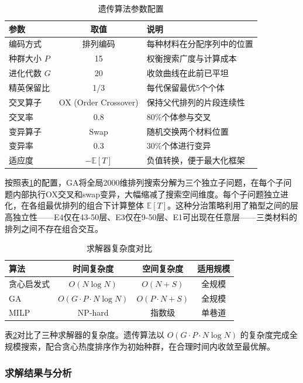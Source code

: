 \documentclass[a4paper]{cumcmthesis}
\newcommand{\headcol}{\rowcolor{tableheadcolor}}
\begin{document}
\begin{table}[htbp]
\centering\footnotesize
\caption{遗传算法参数配置}
\label{tab:ga_params}
\begin{tabular}{lcl}
\toprule
\headcol 参数 & 取值 & 说明 \\
\midrule
编码方式 & 排列编码 & 每种材料在分配序列中的位置 \\
种群大小 $P$ & 15 & 权衡搜索广度与计算成本 \\
进化代数 $G$ & 20 & 收敛曲线在此前已平坦 \\
精英保留比 & 1/3 & 每代保留最优5个个体 \\
交叉算子 & OX (Order Crossover) & 保持父代排列的片段连续性 \\
交叉率 & 0.8 & 80\%个体参与交叉 \\
变异算子 & Swap & 随机交换两个材料位置 \\
变异率 & 0.3 & 30\%个体进行变异 \\
适应度 & $-\mathbb{E}[T]$ & 负值转换，便于最大化框架 \\
\bottomrule
\end{tabular}
\end{table}

按照表\ref{tab:ga_params}的配置，GA将全局2000维排列搜索分解为三个独立子问题，在每个子问题内部执行OX交叉和swap变异，大幅缩减了搜索空间维度。每个子问题独立进化，在各组最优排列的组合下计算整体 $\mathbb{E}[T]$。这种分治策略利用了箱型之间的层高独立性——E4仅在43-50层、E3仅在9-50层、E1可出现在任意层——三类材料的排列之间不存在组合交互。

\begin{table}[htbp]
\centering\footnotesize
\caption{求解器复杂度对比}
\label{tab:complexity}
\begin{tabular}{lccc}
\toprule
\headcol 算法 & 时间复杂度 & 空间复杂度 & 适用规模 \\
\midrule
贪心启发式 & $O(N\log N)$ & $O(N+S)$ & 全规模\\
GA& $O(G\cdot P\cdot N\log N)$ & $O(P\cdot N + S)$ & 全规模\\
MILP& NP-hard & 指数级 & 单巷道\\
\bottomrule
\end{tabular}
\end{table}

表\ref{tab:complexity}对比了三种求解器的复杂度。遗传算法以 $O(G\cdot P\cdot N\log N)$ 的复杂度完成全规模搜索，配合贪心热度排序作为初始种群，在合理时间内收敛至最优解。

\FloatBarrier\subsubsection{求解结果与分析}
\end{document}
